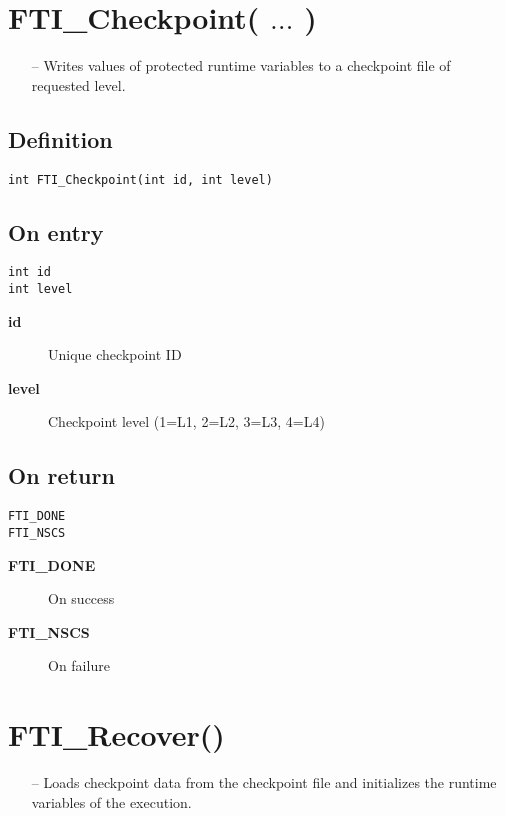 \documentclass{refrep}
\begin{document}
\section{\asciifamily FTI\_Checkpoint( $\dots$ )}\label{sec:fticheckpoint}
\begin{framed}
\begin{itemize}
\item[--] Writes values of protected runtime variables to a checkpoint file of requested level.
\end{itemize}
\end{framed}
\subsection*{Definition}
\begin{lstlisting}[frame=single]
int FTI_Checkpoint(int id, int level)
\end{lstlisting}
\subsection*{On entry}
\begin{lstlisting}[frame=single]
int id
int level
\end{lstlisting}
\begin{description}
\item[\textbf{id}] Unique checkpoint ID
\item[\textbf{level}] Checkpoint level (1=L1, 2=L2, 3=L3, 4=L4)
\end{description}
\subsection*{On return}
\begin{lstlisting}[frame=single]
FTI_DONE
FTI_NSCS
\end{lstlisting}
\begin{description}
\item[\textbf{FTI\_DONE}] On success
\item[\textbf{FTI\_NSCS}] On failure
\end{description}
\newpage
\section{\asciifamily FTI\_Recover()}\label{sec:ftisnapshot}
\begin{framed}
\begin{itemize}
\item[--] Loads checkpoint data from the checkpoint file and initializes the runtime variables of the execution.
\end{itemize}
\end{framed}
\end{document}
